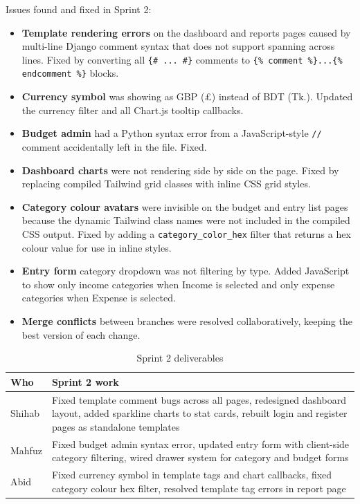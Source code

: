 \documentclass[12pt,a4paper]{report}
\begin{document}
Issues found and fixed in Sprint 2:

\begin{itemize}
  \item \textbf{Template rendering errors} on the dashboard and reports pages caused by multi-line Django comment syntax that does not support spanning across lines. Fixed by converting all \texttt{\{{\#} ... \#\}} comments to \texttt{\{\% comment \%\}...\{\% endcomment \%\}} blocks.
  \item \textbf{Currency symbol} was showing as GBP (£) instead of BDT (Tk.). Updated the currency filter and all Chart.js tooltip callbacks.
  \item \textbf{Budget admin} had a Python syntax error from a JavaScript-style \texttt{//} comment accidentally left in the file. Fixed.
  \item \textbf{Dashboard charts} were not rendering side by side on the page. Fixed by replacing compiled Tailwind grid classes with inline CSS grid styles.
  \item \textbf{Category colour avatars} were invisible on the budget and entry list pages because the dynamic Tailwind class names were not included in the compiled CSS output. Fixed by adding a \texttt{category\_color\_hex} filter that returns a hex colour value for use in inline styles.
  \item \textbf{Entry form} category dropdown was not filtering by type. Added JavaScript to show only income categories when Income is selected and only expense categories when Expense is selected.
  \item \textbf{Merge conflicts} between branches were resolved collaboratively, keeping the best version of each change.
\end{itemize}

\begin{table}[htbp]
\centering
\begin{tabular}{@{}lp{10cm}@{}}
\toprule
\textbf{Who} & \textbf{Sprint 2 work} \\
\midrule
Shihab & Fixed template comment bugs across all pages, redesigned dashboard layout, added sparkline charts to stat cards, rebuilt login and register pages as standalone templates \\[4pt]
Mahfuz & Fixed budget admin syntax error, updated entry form with client-side category filtering, wired drawer system for category and budget forms \\[4pt]
Abid   & Fixed currency symbol in template tags and chart callbacks, fixed category colour hex filter, resolved template tag errors in report page \\
\bottomrule
\end{tabular}
\caption{Sprint 2 deliverables}
\end{table}
\end{document}
